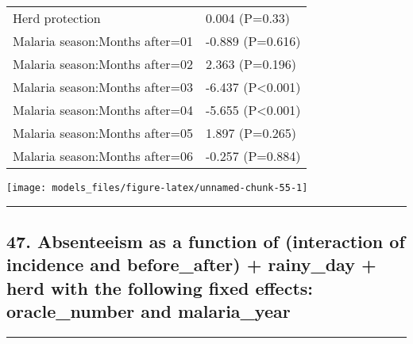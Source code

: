 \documentclass[]{article}
\begin{document}
\begin{longtable}[t]{ll}
\hspace{1em}Herd protection & 0.004 (P=0.33)\\
\hspace{1em}Malaria season:Months after=01 & -0.889 (P=0.616)\\
\hspace{1em}Malaria season:Months after=02 & 2.363 (P=0.196)\\
\hspace{1em}Malaria season:Months after=03 & -6.437 (P<0.001)\\
\hspace{1em}Malaria season:Months after=04 & -5.655 (P<0.001)\\
\hspace{1em}Malaria season:Months after=05 & 1.897 (P=0.265)\\
\hspace{1em}Malaria season:Months after=06 & -0.257 (P=0.884)\\*
\end{longtable}

\begin{center}\texttt{[image: models\_files/figure-latex/unnamed-chunk-55-1]} \end{center}

\newpage

\begin{center}\rule{0.5\linewidth}{\linethickness}\end{center}

\subsection{47. Absenteeism as a function of (interaction of incidence
and before\_after) + rainy\_day + herd with the following fixed effects:
oracle\_number and
malaria\_year}\label{absenteeism-as-a-function-of-interaction-of-incidence-and-before_after-rainy_day-herd-with-the-following-fixed-effects-oracle_number-and-malaria_year}

\begin{center}\rule{0.5\linewidth}{\linethickness}\end{center}
\end{document}
